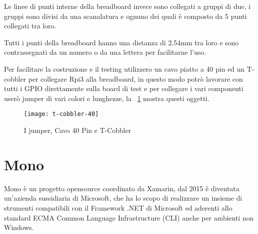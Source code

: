 Le linee di punti interne della breadboard invece sono collegati a gruppi di due, i gruppi sono divisi da una scanalatura e ognuno dei quali è composto da 5 punti collegati tra loro.

Tutti i punti della breadboard  hanno una distanza di 2.54mm tra loro e sono contrassegnati da un numero o da una lettera per facilitarne l'uso.

Per facilitare la costruzione e il testing utilizzero un cavo piatto a 40 pin ed un T-cobbler per collegare Rpi3 alla breadboard, in questo modo potrò lavorare con tutti i GPIO direttamente sulla board di test e per collegare i vari componenti userò jumper di vari colori e lunghezze, la \figurename~\ref{fig:t-cobbler-40} mostra questi oggetti. 


\begin{figure}[htbp!] 
	\centering    
	\texttt{[image: t-cobbler-40]}
	\caption[t-cobbler-40]{I jumper, Cavo 40 Pin e T-Cobbler}
	\label{fig:t-cobbler-40}
\end{figure}


\section{Mono}
Mono è un progetto opensource coordinato da Xamarin, dal 2015 è diventata un'azienda sussidiaria di Microsoft, che ha lo scopo di realizzare  un insieme di strumenti compatibili con il Framework .NET di Microsoft ed aderenti allo standard  ECMA Common Language Infrastructure (CLI)  anche per ambienti non Windows.


